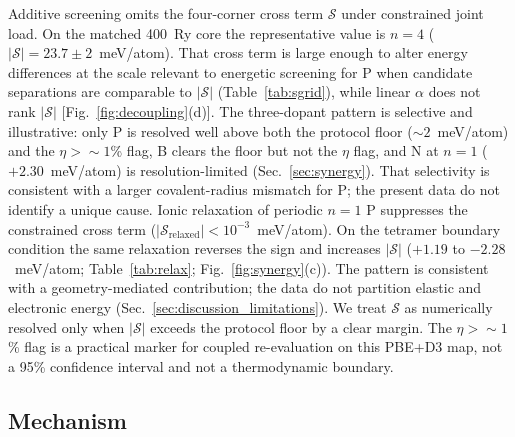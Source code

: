 \documentclass[%
 reprint,
 groupedaddress,
 amsmath,amssymb,
 aps,
 prb,
 floatfix,
]{revtex4-2}
\begin{document}
Additive screening omits the four-corner cross term $\mathcal{S}$ under constrained joint load.
On the matched 400~Ry core the representative value is $n{=}4$ ($|\mathcal{S}|=23.7\pm 2$~meV/atom). That cross term is large enough to alter energy differences at the scale relevant to energetic screening for P when candidate separations are comparable to $|\mathcal{S}|$ (Table~\ref{tab:sgrid}), while linear $\alpha$ does not rank $|\mathcal{S}|$ [Fig.~\ref{fig:decoupling}(d)].
The three-dopant pattern is selective and illustrative: only P is resolved well above both the protocol floor (${\sim}2$~meV/atom) and the $\eta>{\sim}1$\% flag, B clears the floor but not the $\eta$ flag, and N at $n{=}1$ ($+2.30$~meV/atom) is resolution-limited (Sec.~\ref{sec:synergy}).
That selectivity is consistent with a larger covalent-radius mismatch for P; the present data do not identify a unique cause.
Ionic relaxation of periodic $n{=}1$ P suppresses the constrained cross term ($|\mathcal{S}_{\mathrm{relaxed}}|<10^{-3}$~meV/atom).
On the tetramer boundary condition the same relaxation reverses the sign and increases $|\mathcal{S}|$ ($+1.19$ to $-2.28$~meV/atom; Table~\ref{tab:relax}; Fig.~\ref{fig:synergy}(c)).
The pattern is consistent with a geometry-mediated contribution; the data do not partition elastic and electronic energy (Sec.~\ref{sec:discussion_limitations}).
We treat $\mathcal{S}$ as numerically resolved only when $|\mathcal{S}|$ exceeds the protocol floor by a clear margin.
The $\eta>{\sim}1$\% flag is a practical marker for coupled re-evaluation on this PBE+D3 map, not a 95\% confidence interval and not a thermodynamic boundary.

\subsection{Mechanism}
\label{sec:mechanistic}
\end{document}
